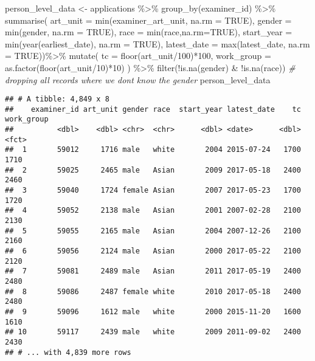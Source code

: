 \documentclass[
]{article}
\newenvironment{Shaded}{\begin{snugshade}}{\end{snugshade}}
\newcommand{\AttributeTok}[1]{\textcolor[rgb]{0.77,0.63,0.00}{#1}}
\newcommand{\CommentTok}[1]{\textcolor[rgb]{0.56,0.35,0.01}{\textit{#1}}}
\newcommand{\ConstantTok}[1]{\textcolor[rgb]{0.00,0.00,0.00}{#1}}
\newcommand{\DecValTok}[1]{\textcolor[rgb]{0.00,0.00,0.81}{#1}}
\newcommand{\FunctionTok}[1]{\textcolor[rgb]{0.00,0.00,0.00}{#1}}
\newcommand{\NormalTok}[1]{#1}
\newcommand{\OtherTok}[1]{\textcolor[rgb]{0.56,0.35,0.01}{#1}}
\newcommand{\SpecialCharTok}[1]{\textcolor[rgb]{0.00,0.00,0.00}{#1}}
\begin{document}
\begin{Shaded}
\begin{Highlighting}[]
\NormalTok{person\_level\_data }\OtherTok{\textless{}{-}}\NormalTok{ applications }\SpecialCharTok{\%\textgreater{}\%} 
  \FunctionTok{group\_by}\NormalTok{(examiner\_id) }\SpecialCharTok{\%\textgreater{}\%} 
  \FunctionTok{summarise}\NormalTok{(}
    \AttributeTok{art\_unit =} \FunctionTok{min}\NormalTok{(examiner\_art\_unit, }\AttributeTok{na.rm =} \ConstantTok{TRUE}\NormalTok{),}
    \AttributeTok{gender =} \FunctionTok{min}\NormalTok{(gender, }\AttributeTok{na.rm =} \ConstantTok{TRUE}\NormalTok{),}
    \AttributeTok{race =} \FunctionTok{min}\NormalTok{(race,}\AttributeTok{na.rm=}\ConstantTok{TRUE}\NormalTok{),}
    \AttributeTok{start\_year =} \FunctionTok{min}\NormalTok{(}\FunctionTok{year}\NormalTok{(earliest\_date), }\AttributeTok{na.rm =} \ConstantTok{TRUE}\NormalTok{),}
    \AttributeTok{latest\_date =} \FunctionTok{max}\NormalTok{(latest\_date, }\AttributeTok{na.rm =} \ConstantTok{TRUE}\NormalTok{))}\SpecialCharTok{\%\textgreater{}\%} 
  \FunctionTok{mutate}\NormalTok{(}
    \AttributeTok{tc =} \FunctionTok{floor}\NormalTok{(art\_unit}\SpecialCharTok{/}\DecValTok{100}\NormalTok{)}\SpecialCharTok{*}\DecValTok{100}\NormalTok{,}
    \AttributeTok{work\_group =} \FunctionTok{as.factor}\NormalTok{(}\FunctionTok{floor}\NormalTok{(art\_unit}\SpecialCharTok{/}\DecValTok{10}\NormalTok{)}\SpecialCharTok{*}\DecValTok{10}\NormalTok{)}
\NormalTok{  ) }\SpecialCharTok{\%\textgreater{}\%} 
  \FunctionTok{filter}\NormalTok{(}\SpecialCharTok{!}\FunctionTok{is.na}\NormalTok{(gender) }\SpecialCharTok{\&} \SpecialCharTok{!}\FunctionTok{is.na}\NormalTok{(race)) }\CommentTok{\# dropping all records where we don\textquotesingle{}t know the gender}
\NormalTok{person\_level\_data}
\end{Highlighting}
\end{Shaded}

\begin{verbatim}
## # A tibble: 4,849 x 8
##    examiner_id art_unit gender race  start_year latest_date    tc work_group
##          <dbl>    <dbl> <chr>  <chr>      <dbl> <date>      <dbl> <fct>     
##  1       59012     1716 male   white       2004 2015-07-24   1700 1710      
##  2       59025     2465 male   Asian       2009 2017-05-18   2400 2460      
##  3       59040     1724 female Asian       2007 2017-05-23   1700 1720      
##  4       59052     2138 male   Asian       2001 2007-02-28   2100 2130      
##  5       59055     2165 male   Asian       2004 2007-12-26   2100 2160      
##  6       59056     2124 male   Asian       2000 2017-05-22   2100 2120      
##  7       59081     2489 male   Asian       2011 2017-05-19   2400 2480      
##  8       59086     2487 female white       2010 2017-05-18   2400 2480      
##  9       59096     1612 male   white       2000 2015-11-20   1600 1610      
## 10       59117     2439 male   white       2009 2011-09-02   2400 2430      
## # ... with 4,839 more rows
\end{verbatim}
\end{document}
